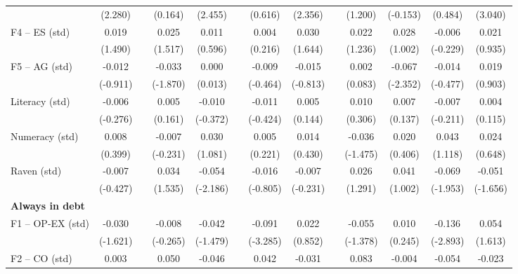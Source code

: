 \begin{table}[htbp]
{\begin{tabular}{lcccccccccccc}
          & (2.280) &       & (0.164) & (2.455) &       & (0.616) & (2.356) &       & (1.200) & (-0.153) & (0.484) & (3.040) \\
    F4 -- ES (std) & 0.019 &       & 0.025 & 0.011 &       & 0.004 & 0.030 &       & 0.022 & 0.028 & -0.006 & 0.021 \\
          & (1.490) &       & (1.517) & (0.596) &       & (0.216) & (1.644) &       & (1.236) & (1.002) & (-0.229) & (0.935) \\
    F5 -- AG (std) & -0.012 &       & \cellcolor[rgb]{ 1,  1,  0}-0.033 & 0.000 &       & -0.009 & -0.015 &       & 0.002 & \cellcolor[rgb]{ 1,  1,  0}-0.067 & -0.014 & 0.019 \\
          & (-0.911) &       & (-1.870) & (0.013) &       & (-0.464) & (-0.813) &       & (0.083) & (-2.352) & (-0.477) & (0.903) \\
    Literacy (std) & -0.006 &       & 0.005 & -0.010 &       & -0.011 & 0.005 &       & 0.010 & 0.007 & -0.007 & 0.004 \\
          & (-0.276) &       & (0.161) & (-0.372) &       & (-0.424) & (0.144) &       & (0.306) & (0.137) & (-0.211) & (0.115) \\
    Numeracy (std) & 0.008 &       & -0.007 & 0.030 &       & 0.005 & 0.014 &       & -0.036 & 0.020 & 0.043 & 0.024 \\
          & (0.399) &       & (-0.231) & (1.081) &       & (0.221) & (0.430) &       & (-1.475) & (0.406) & (1.118) & (0.648) \\
    Raven (std) & -0.007 &       & 0.034 & \cellcolor[rgb]{ 1,  1,  0}-0.054 &       & -0.016 & -0.007 &       & 0.026 & 0.041 & \cellcolor[rgb]{ 1,  1,  0}-0.069 & \cellcolor[rgb]{ 1,  1,  0}-0.051 \\
          & (-0.427) &       & (1.535) & (-2.186) &       & (-0.805) & (-0.231) &       & (1.291) & (1.002) & (-1.953) & (-1.656) \\
    \midrule
    \textbf{Always in debt} &       &       &       &       &       &       &       &       &       &       &       &  \\
    F1 -- OP-EX (std) & -0.030 &       & -0.008 & -0.042 &       & \cellcolor[rgb]{ 1,  1,  0}-0.091 & 0.022 &       & -0.055 & 0.010 & \cellcolor[rgb]{ 1,  1,  0}-0.136 & 0.054 \\
          & (-1.621) &       & (-0.265) & (-1.479) &       & (-3.285) & (0.852) &       & (-1.378) & (0.245) & (-2.893) & (1.613) \\
    F2 -- CO (std) & 0.003 &       & \cellcolor[rgb]{ 1,  1,  0}0.050 & -0.046 &       & 0.042 & -0.031 &       & \cellcolor[rgb]{ 1,  1,  0}0.083 & -0.004 & -0.054 & -0.023 \\

\end{tabular}}
\end{table}
